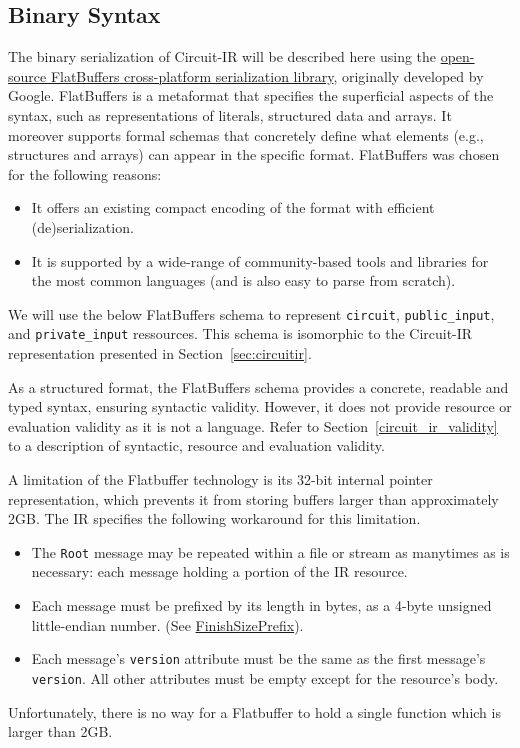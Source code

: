 
\begin{appendices}

\section{Binary Syntax}\label{binary_syntax}
The binary serialization of Circuit-IR will be described here using the \href{https://google.github.io/flatbuffers/}{open-source FlatBuffers cross-platform serialization library}, originally developed by Google.
FlatBuffers is a metaformat that specifies the superficial aspects of the syntax, such as representations of literals, structured data and arrays.
It moreover supports formal schemas that concretely define what elements (e.g., structures and arrays) can appear in the specific format.
FlatBuffers was chosen for the following reasons:
\begin{itemize}
\item It offers an existing compact encoding of the format with efficient (de)serialization.
\item It is supported by a wide-range of community-based tools and libraries for the most common languages (and is also easy to parse from scratch).
\end{itemize}

We will use the below FlatBuffers schema to represent \texttt{circuit}, \texttt{public\_input}, and \texttt{private\_input} ressources. This schema is isomorphic to the Circuit-IR representation presented in Section~\ref{sec:circuitir}.



As a structured format, the FlatBuffers schema provides a concrete, readable and typed syntax,
ensuring syntactic validity.
However, it does not provide resource or evaluation validity as it is not a language.
Refer to Section~\ref{circuit_ir_validity} to a description of syntactic, resource and evaluation validity.

A limitation of the Flatbuffer technology is its 32-bit internal pointer representation, which prevents it from storing buffers larger than approximately 2GB.
The IR specifies the following workaround for this limitation.

\begin{itemize}
  \item The \texttt{Root} message may be repeated within a file or stream as manytimes as is necessary: each message holding a portion of the IR resource.
  \item Each message must be prefixed by its length in bytes, as a 4-byte unsigned little-endian number. (See \href{https://google.github.io/flatbuffers/class_flat_buffers_1_1_flat_buffer_builder.html#a425ab2bd13a0e4331a7190ec2d17c3b2}{FinishSizePrefix}).
  \item Each message's \texttt{version} attribute must be the same as the first message's \texttt{version}. All other attributes must be empty except for the resource's body.
\end{itemize}

Unfortunately, there is no way for a Flatbuffer to hold a single function which is larger than 2GB.

\end{appendices}
